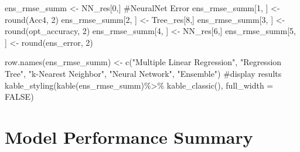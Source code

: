 \documentclass[
]{article}
\newenvironment{Shaded}{\begin{snugshade}}{\end{snugshade}}
\newcommand{\NormalTok}[1]{#1}
\begin{document}
\begin{Shaded}
\begin{Highlighting}[]
\NormalTok{ens\_rmse\_summ \textless{}{-} NN\_res[0,] \#NeuralNet Error}
\NormalTok{ens\_rmse\_summ[1, ] \textless{}{-} round(Acc4, 2)}
\NormalTok{ens\_rmse\_summ[2, ] \textless{}{-} Tree\_res[8,]}
\NormalTok{ens\_rmse\_summ[3, ] \textless{}{-} round(opt\_accuracy, 2)}
\NormalTok{ens\_rmse\_summ[4, ] \textless{}{-} NN\_res[6,]}
\NormalTok{ens\_rmse\_summ[5, ] \textless{}{-} round(ens\_error, 2)}

\NormalTok{row.names(ens\_rmse\_summ) \textless{}{-} c("Multiple Linear Regression",}
\NormalTok{                              "Regression Tree",}
\NormalTok{                              "k{-}Nearest Neighbor",}
\NormalTok{                              "Neural Network",}
\NormalTok{                              "Ensemble")}
\NormalTok{\#display results}
\NormalTok{kable\_styling(kable(ens\_rmse\_summ)\%\textgreater{}\% kable\_classic(), full\_width = FALSE)}
\end{Highlighting}
\end{Shaded}

\hypertarget{model-performance-summary}{%
\section{Model Performance Summary}\label{model-performance-summary}}
\end{document}
